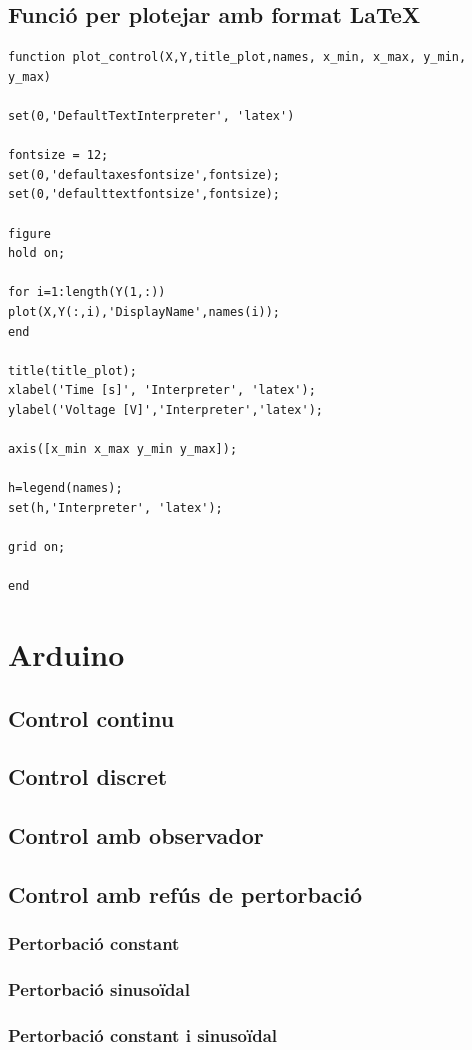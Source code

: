 \documentclass[12pt,a4paper,final,twoside,openright]{report}
\begin{document}
\section{Funció per plotejar amb format \LaTeX}\label{ann:mat_plot}
\begin{verbatim}
function plot_control(X,Y,title_plot,names, x_min, x_max, y_min, y_max)

set(0,'DefaultTextInterpreter', 'latex')

fontsize = 12;
set(0,'defaultaxesfontsize',fontsize);
set(0,'defaulttextfontsize',fontsize);

figure
hold on;

for i=1:length(Y(1,:))
plot(X,Y(:,i),'DisplayName',names(i));
end

title(title_plot);
xlabel('Time [s]', 'Interpreter', 'latex');
ylabel('Voltage [V]','Interpreter','latex');

axis([x_min x_max y_min y_max]);

h=legend(names);
set(h,'Interpreter', 'latex');

grid on;

end

\end{verbatim}

\chapter{Arduino}

\section{Control continu}

\section{Control discret}

\section{Control amb observador}

\section{Control amb refús de pertorbació}

\subsection{Pertorbació constant}

\subsection{Pertorbació sinusoïdal}

\subsection{Pertorbació constant i sinusoïdal}
\end{document}
